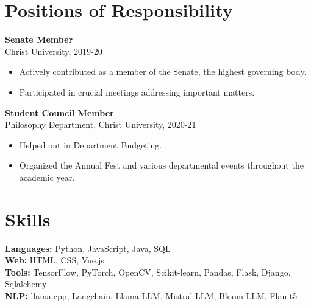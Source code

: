 \documentclass[a4paper,10pt]{article}
\begin{document}
\section*{Positions of Responsibility}
\textbf{Senate Member} \\
Christ University, 2019-20
\begin{itemize}[noitemsep]
    \item Actively contributed as a member of the Senate, the highest governing body.
    \item Participated in crucial meetings addressing important matters.
\end{itemize}
\textbf{Student Council Member} \\
Philosophy Department, Christ University, 2020-21
\begin{itemize}[noitemsep]
    \item Helped out in Department Budgeting.
    \item Organized the Annual Fest and various departmental events throughout the academic year.
\end{itemize}

\section*{Skills}
\textbf{Languages:} Python, JavaScript, Java, SQL \\
\textbf{Web:} HTML, CSS, Vue.js \\
\textbf{Tools:} TensorFlow, PyTorch, OpenCV, Scikit-learn, Pandas, Flask, Django, Sqlalchemy \\
\textbf{NLP:} llama.cpp, Langchain, Llama LLM, Mistral LLM, Bloom LLM, Flan-t5
\end{document}
